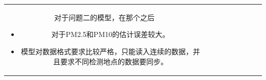 \documentclass[bwprint]{gmcmthesis}
\numberwithin{figure}{section}
\begin{document}
\begin{table}
\begin{center}
{\begin{tabular}[ht]{|c|c|c|c|c|c|c|c|c|}
对于问题二的模型，在那个之后

\begin{itemize}
	\item 对于PM2.5和PM10的估计误差较大。
	\item 模型对数据格式要求比较严格，只能读入连续的数据，并且要求不同检测地点的数据要同步。
\end{itemize}









%


\end{tabular}}
\end{center}
\end{table}
\end{document}
